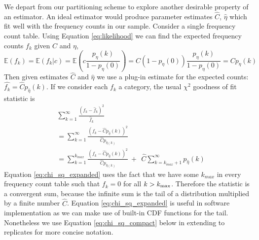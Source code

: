 \documentclass[oupdraft]{bio}
\begin{document}
We depart from our partitioning scheme to explore another desirable property of an estimator.  An ideal estimator would produce parameter estimates $\widehat{C}$, $\widehat{\eta}$ which fit well with the frequency counts in our sample.  Consider a single frequency count table.  Using Equation \ref{eq:likelihood} we can find the expected frequency counts $f_k$ given $C$ and $\eta$,
\begin{equation}
 \mathbb{E}\left(f_k\right) = \mathbb{E}\left(f_k|c \right) = \mathbb{E}\left( c \frac{p_{\eta}(k)}{1-p_{\eta}(0)} \right) = C\left(1-p_{\eta}(0) \right) \frac{p_{\eta}(k)}{1-p_{\eta}(0)} = Cp_{\eta}(k)
\end{equation}
Then given estimates $\widehat{C}$ and $\widehat{\eta}$ we use a plug-in estimate for the expected counts: $\widehat{f_k} = \widehat{C}p_{\widehat{\eta}}(k)$.  If we consider each $f_k$ a category, the usual $\chi^2$ goodness of fit statistic is
\begin{align}
&\sum_{k=1}^{\infty} \frac{\left(f_k - \widehat{f}_k \right)^2 }{\widehat{f}_k} \\
&=\sum_{k=1}^{\infty} \frac{\left(f_k - \widehat{C}p_{\widehat{\eta}}(k) \right)^2 }{\widehat{C} p_{\widehat{\eta}(k)}}  \label{eq:chi_sq_compact} \\
& = \sum_{k=1}^{k_{max}} \frac{\left(f_k - \widehat{C}p_{\widehat{\eta}}(k) \right)^2 }{\widehat{C} p_{\widehat{\eta}(k)}} \ + \ \ \widehat{C} \sum_{k = k_{max}+1}^{\infty} p_{\widehat{\eta}}(k) \label{eq:chi_sq_expanded}
\end{align}
Equation \ref{eq:chi_sq_expanded} uses the fact that we have some $k_{max}$ in every frequency count table such that $f_k = 0$ for all $k > \kmax$.  Therefore the statistic is a convergent sum, because the infinite sum is the tail of a distribution multiplied by a finite number $\widehat{C}$.  Equation \ref{eq:chi_sq_expanded} is useful in software implementation as we can make use of built-in CDF functions for the tail.  Nonetheless we use Equation \ref{eq:chi_sq_compact} below in extending to replicates for more concise notation.
\end{document}
